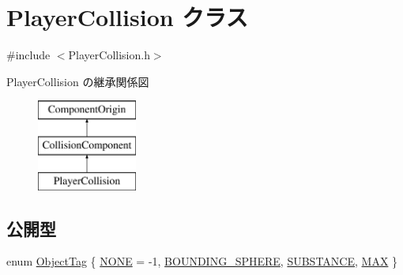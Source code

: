 \hypertarget{class_player_collision}{}\section{Player\+Collision クラス}
\label{class_player_collision}


{\ttfamily \#include $<$Player\+Collision.\+h$>$}

Player\+Collision の継承関係図\begin{figure}[H]
\begin{center}
\leavevmode
\includegraphics[height=3.000000cm]{class_player_collision}
\end{center}
\end{figure}
\subsection*{公開型}
\begin{DoxyCompactItemize}
\item 
enum \mbox{\hyperlink{class_player_collision_a628e8898ff4fc1f85eb4ba44eb0a6907}{Object\+Tag}} \{ \mbox{\hyperlink{class_player_collision_a628e8898ff4fc1f85eb4ba44eb0a6907abde9854e7cb5dd2906a4f5e7ca3a896d}{N\+O\+NE}} = -\/1, 
\mbox{\hyperlink{class_player_collision_a628e8898ff4fc1f85eb4ba44eb0a6907ae8cec799ba827b372f0d4bedec1b9bbb}{B\+O\+U\+N\+D\+I\+N\+G\+\_\+\+S\+P\+H\+E\+RE}}, 
\mbox{\hyperlink{class_player_collision_a628e8898ff4fc1f85eb4ba44eb0a6907a1bdf29253670ff99684ddff916536360}{S\+U\+B\+S\+T\+A\+N\+CE}}, 
\mbox{\hyperlink{class_player_collision_a628e8898ff4fc1f85eb4ba44eb0a6907aa9f8cab198da5574b7a22acc4ecd42d5}{M\+AX}}
 \}
\end{DoxyCompactItemize}
